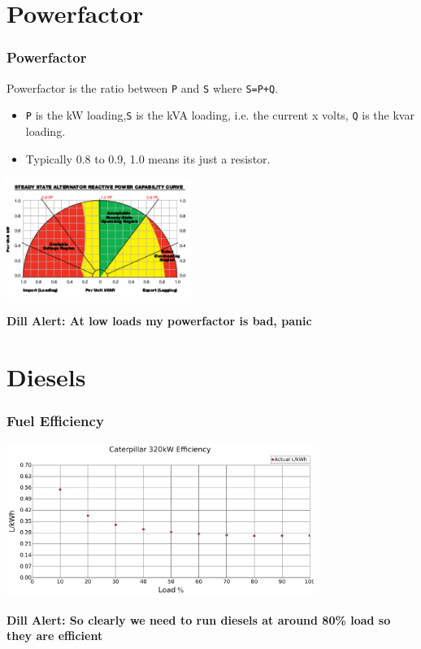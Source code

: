 \documentclass[a4paper,handout]{beamer}
\def\dill#1{\textcolor{RawSienna}{\textbf{Dill Alert: #1}}}
\begin{document}
\section{Powerfactor}
\begin{frame}\frametitle{Powerfactor}
Powerfactor is the ratio between \texttt{P} and \texttt{S} where
\texttt{S=P+Q}.
\begin{itemize}
\item \texttt{P} is the kW loading,\texttt{S} is the kVA loading,
  i.e. the current x volts, \texttt{Q} is the kvar loading.
\pause
\item Typically 0.8 to 0.9, 1.0 means its just a resistor.
\end{itemize}
\pause
\includegraphics[width=6cm]{pf.pdf}
\pause

\dill{At low loads my powerfactor is bad, panic}
\end{frame}

\section{Diesels}
\begin{frame}\frametitle{Fuel Efficiency}
\includegraphics[width=10cm]{limits/figFuelCurve1.pdf}
\pause

\dill{So clearly we need to run diesels at around 80\% load 
  so they are efficient}
\end{frame}
\end{document}
